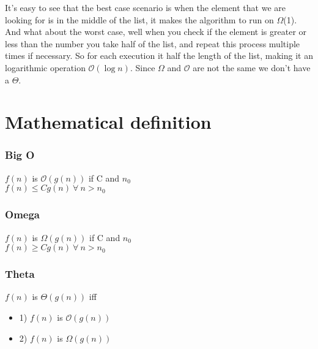 \documentclass{report}
\begin{document}
It's easy to see that the best case scenario is when the element that we are looking for is in the middle of the list, it makes the algorithm to run on $\Omega$(1). And what about the worst case, well when you check if the element is greater or less than the number you take half of the list, and repeat this process multiple times if necessary. So for each execution it half the length of the list, making it an logarithmic operation $\mathcal{O} (\log{}{n})$. Since $\Omega$ and $\mathcal{O}$ are not the same we don't have a $\Theta$.

\section*{Mathematical definition}
\subsubsection*{Big O}
\begin{center}
$f(n)$ is $\mathcal{O}(g(n))$ if C and $n_{0}$\\
$f(n) \le Cg(n)\ \forall\ n > n_{0}$
\end{center}

\subsubsection*{Omega}
\begin{center}
$f(n)$ is $\Omega(g(n))$ if C and $n_{0}$\\
$f(n) \ge Cg(n)\ \forall\ n > n_{0}$
\end{center}

\subsubsection*{Theta}
\begin{center}
$f(n)$ is $\Theta(g(n))$ iff
\begin{itemize}
  \center
  \item 1) $f(n)$ is $\mathcal{O}(g(n))$\\
  \item 2) $f(n)$ is $\Omega(g(n))$
\end{itemize}
\end{center}
\end{document}
